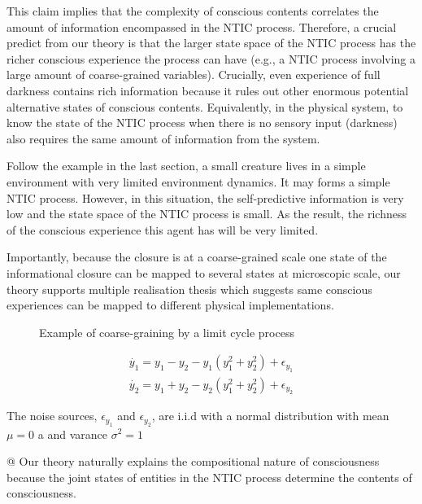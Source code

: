 		This claim implies that the complexity of conscious contents correlates the amount of information encompassed in the NTIC process. Therefore, a crucial predict from our theory is that the larger state space of the NTIC process has the richer  conscious experience the process can have (e.g., a NTIC process involving a large amount of coarse-grained variables). Crucially, even experience of full darkness contains rich information because it rules out other enormous potential alternative states of conscious contents. Equivalently, in the physical system, to know the state of the NTIC process when there is no sensory input (darkness) also requires the same amount of information from the system. 
		
		Follow the example in the last section, a small creature lives in a simple environment with very limited environment dynamics. It may forms a simple NTIC process. However, in this situation, the self-predictive information is very low and the state space of the NTIC process is small. As the result, the richness of the conscious experience this agent has will be very limited. 
		
		Importantly, because the closure is at a coarse-grained scale one state of the informational closure can be mapped to several states at microscopic scale, our theory supports multiple realisation thesis  which suggests same conscious experiences can be mapped to different physical implementations. 
		
		\begin{figure}[H]
			\label{fig:limitCycle}
			\caption{Example of coarse-graining by a limit cycle process}
		\end{figure}
		

		\begin{equation}\label{eq:LimitCycleExample}
			\begin{array}{l}{\dot{y_1}=y_1-y_2-y_1\left(y_1^{2}+y_2^{2} \right)+\epsilon_{y_1}} \\ {\dot{y_2}=y_1+y_2-y_2\left(y_1^{2}+y_2^{2}\right)+\epsilon_{y_2}}\end{array}
		\end{equation}    		
		
		The noise sources, $\epsilon_{y_1}$ and $\epsilon_{y_2}$, are i.i.d with a normal distribution with mean $\mu=0$ a and varance $\sigma^{2}=1$     
		
		
		\begin{WritingMaterials}
			@ Our theory naturally explains the compositional nature of consciousness because the joint states of entities in the NTIC process determine the contents of consciousness.

		\end{WritingMaterials}
			
